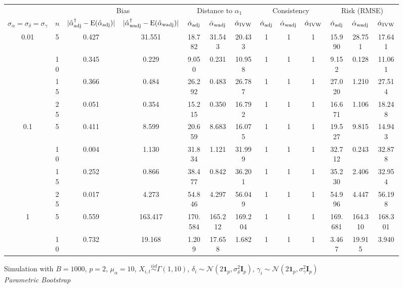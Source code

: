 \documentclass[11pt]{article}
\newcommand{\simiid}{\stackrel{iid}{\sim}} %
\def\normal#1#2{\mathcal{N}(#1,#2)} %
\def\E#1{\mathrm{E}(#1)} %
\theoremstyle{definition}
\begin{document}
\begin{sidewaysfigure}
 \caption{Simulation  with $B = 1000$, $p = 2$, $\mu_{\alpha}=10$, $X_{i,t} \simiid \Gamma(1,10)$, $\delta_i \sim \normal{2\mathbf{1}_p}{\sigma^2_{\delta}\mathbf{I}_p}$, $\gamma_i \sim \normal{2\mathbf{1}_p}{\sigma^2_{\gamma}\mathbf{I}_p}$ \\ \emph{Parametric Bootstrap} } \vspace{.2cm}
\centering
\begin{tabular}{cc|cc|ccc|ccc|ccc}
&  & \multicolumn{2}{c|}{Bias} & \multicolumn{3}{c|}{Distance to $\alpha_1$} & \multicolumn{3}{c}{Consistency} & \multicolumn{3}{c}{Risk (RMSE)} \\ 
$\sigma_{\alpha} = \sigma_{\delta}=\sigma_{\gamma}$ & $n$ & $|\hat{\alpha}_{\rm adj}^{\dagger}-\E{\hat{\alpha}_{\rm adj}}|$ & $|\hat{\alpha}_{\rm wadj}^{\dagger}-\E{\hat{\alpha}_{\rm wadj}}|$ & $\hat{\alpha}_{\rm adj}$ & $\hat{\alpha}_{\rm wadj}$ & $\hat{\alpha}_{\rm IVW}$ & $\hat{\alpha}_{\rm adj}$ & $\hat{\alpha}_{\rm wadj}$ & $\hat{\alpha}_{\rm IVW}$ & $\hat{\alpha}_{\rm adj}$ & $\hat{\alpha}_{\rm wadj}$ & $\hat{\alpha}_{\rm IVW}$ \\[.3cm] 
\multirow{4}{*}{0.01} & 5 & 0.427 & 31.551 & 18.782 & 31.543 & 20.433 & 1  & 1  & 1  & 15.990 & 28.751 & 17.641 \\ 
   &10 & 0.345 & 0.229 & 9.050 & 0.231 & 10.958 & 1  & 1  & 1  & 9.152 & 0.128 & 11.061 \\ 
   & 15 & 0.366 & 0.484 & 26.292 & 0.483 & 26.787 & 1  & 1  & 1  & 27.020 & 1.210 & 27.514 \\ 
   & 25 & 0.051 & 0.354 & 15.215 & 0.350 & 16.792 & 1  & 1  & 1  & 16.671 & 1.106 & 18.248 \\[.3cm] 
\multirow{4}{*}{0.1} &  5 & 0.411 & 8.599 & 20.659 & 8.683 & 16.075 & 1  & 1  & 1  & 19.527 & 9.815 & 14.943 \\ 
   &10 & 0.004 & 1.130 & 31.834 & 1.121 & 31.999 & 1  & 1  & 1  & 32.712 & 0.243 & 32.878 \\ 
   &15 & 0.252 & 0.866 & 38.477 & 0.842 & 36.201 & 1  & 1  & 1  & 35.230 & 2.406 & 32.954 \\ 
  & 25 & 0.017 & 4.273 & 54.846 & 4.297 & 56.049 & 1  & 1  & 1  & 54.996 & 4.447 & 56.198 \\[.3cm] 
\multirow{4}{*}{1} &  5 & 0.559 & 163.417 & 170.584 & 165.212 & 169.204 & 1  & 1  & 1  & 169.681 & 164.310 & 168.301 \\ 
 &  10 & 0.732 & 19.168 & 1.209 & 17.658 & 1.682 & 1  & 1  & 1  & 3.467 & 19.915 & 3.940 \\ 

\end{tabular}
\end{sidewaysfigure}
\end{document}
